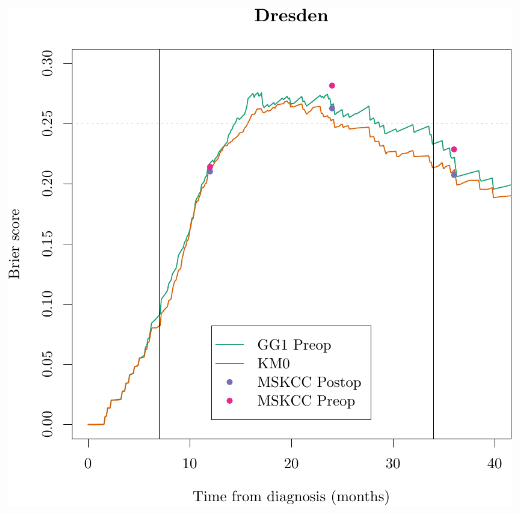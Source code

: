\documentclass{article}\usepackage[]{graphicx}\usepackage[]{color}
\makeatletter
\def\maxwidth{ %
  \ifdim\Gin@nat@width>\linewidth
    \linewidth
  \else
    \Gin@nat@width
  \fi
}
\newenvironment{knitrout}{}{} %
\makeatother
\begin{document}
\begin{knitrout}
{\centering \includegraphics[width=\maxwidth]{figure/07-prob-bs-paths-plot-dresden-2} 

}



\end{knitrout}
\end{document}
